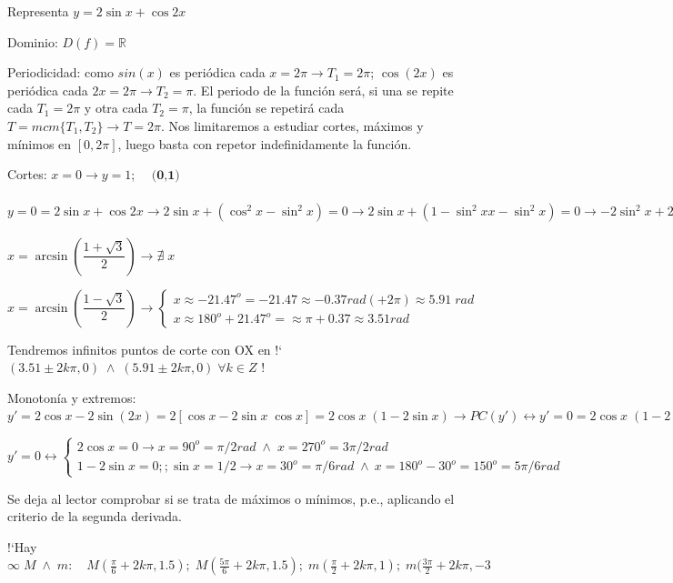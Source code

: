 \begin{ejre} Representa $y=2 \sin x + \cos 2x$
	
\end{ejre}

\begin{proofw}\renewcommand{\qedsymbol}{$\diamond$}	

Dominio: $D(f)=\mathbb R$

Periodicidad: como $sin (x)$ es periódica cada $x=2\pi \to T_1=2\pi$; $\cos(2x)$ es periódica cada $2x=2\pi \to T_2=\pi$. El periodo de la función será, si una se repite cada  $T_1=2\pi$ y otra cada $T_2=\pi$, la función se repetirá cada $T=mcm\{T_1, T_2\} \to T=2\pi$. Nos limitaremos a estudiar cortes, máximos y mínimos en $[0,2\pi]$, luego basta con repetor indefinidamente la función.

Cortes: $x=0 \to y=1$; $\quad \textbf{(0,1)}$

$y=0=2 \sin x + \cos 2x \to 2\sin x + (\cos^2 x-\sin^2 x)=0 \to  2\sin x + (1-\sin^2 x x-\sin^2 x)=0 \to -2\sin^2 x +2\sin x +1 =0 \to \sin x = \dfrac {1 \pm \sqrt{3}}{2} $

$x=\arcsin \left(\dfrac {1 + \sqrt{3} } {2} \right) \to \nexists \; x$

$x=\arcsin \left(\dfrac {1 - \sqrt{3} } {2} \right) \to  
\begin{cases}
	x \approx -21.47^o = -21.47  \approx -0.37  rad (+2\pi) \approx 5.91\; rad \\
	x \approx 180^o +21.47^o = \approx \pi+0.37 \approx 3.51 rad 
\end{cases}$


 Tendremos infinitos puntos de corte con OX en  !` $(3.51 \pm 2k\pi,0)\;\wedge \;(5.91 \pm 2k\pi,0)\; \forall k \in Z$ !

Monotonía y extremos: $y'=2\cos x -2\sin (2x)= 2[\cos x - 2 \sin x \; \cos x] = 2 \cos x \; (1-2\sin x) \to PC(y') \leftrightarrow y'=0= 2 \cos x \; (1-2\sin x) \to $

$y'=0 \leftrightarrow 
\begin{cases}{2}
\cos x=0 \to x=90^o = \pi/2 rad \; \wedge \; x= 270^o = 3\pi /2 rad \\
1-2\sin x=0;; \sin x=1/2 \to x=30^o =\pi /6 rad \; \wedge \ x=180^o-30^o = 150^o = 5\pi/6 rad	
\end{cases}$

Se deja al lector comprobar si se trata de máximos o mínimos, p.e., aplicando el criterio de la segunda derivada.

!`Hay $\infty \; M \; \wedge \; m: \quad M(\frac \pi 6 + 2k\pi, 1.5); \; M(\frac {5\pi}{6} +2k\pi,1.5); \; m(\frac \pi 2 + 2k\pi, 1); \; m(\frac {3\pi}{2}+2k\pi, -3$ 


\end{proofw}
